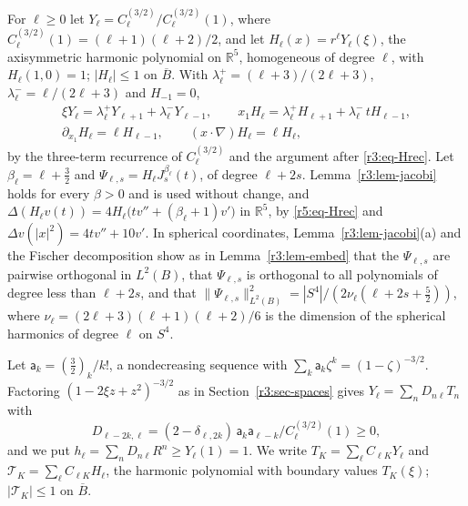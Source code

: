\documentclass[11pt]{amsart}
\theoremstyle{definition}
\theoremstyle{remark}
\numberwithin{equation}{section}
\newcommand{\R}{\mathbb{R}}
\newcommand{\nrm}[1]{\lVert #1\rVert}
\begin{document}
For $\ell\geq0$ let $Y_\ell=C^{(3/2)}_\ell/C^{(3/2)}_\ell(1)$, where $C^{(3/2)}_\ell(1)=(\ell+1)(\ell+2)/2$, and let $H_\ell(x)=r^\ell Y_\ell(\xi)$, the axisymmetric harmonic polynomial on $\R^5$, homogeneous of degree $\ell$, with $H_\ell(1,0)=1$; $|H_\ell|\leq1$ on $\overline B$. With $\lambda^+_\ell=(\ell+3)/(2\ell+3)$, $\lambda^-_\ell=\ell/(2\ell+3)$ and $H_{-1}=0$,
\begin{equation}\label{r5:eq-Hrec}
\begin{gathered}
\xi Y_\ell=\lambda^+_\ell Y_{\ell+1}+\lambda^-_\ell Y_{\ell-1},\qquad x_1H_\ell=\lambda^+_\ell H_{\ell+1}+\lambda^-_\ell\,tH_{\ell-1},\\
\partial_{x_1}H_\ell=\ell H_{\ell-1},\qquad(x\cdot\nabla)H_\ell=\ell H_\ell,
\end{gathered}
\end{equation}
by the three-term recurrence of $C^{(3/2)}_\ell$ and the argument after \eqref{r3:eq-Hrec}. Let $\beta_\ell=\ell+\frac32$ and $\Psi_{\ell,s}=H_\ell J^{\beta_\ell}_s(t)$, of degree $\ell+2s$. Lemma~\ref{r3:lem-jacobi} holds for every $\beta>0$ and is used without change, and $\Delta(H_\ell v(t))=4H_\ell\big(tv''+(\beta_\ell+1)v'\big)$ in $\R^5$, by \eqref{r5:eq-Hrec} and $\Delta v(|x|^2)=4tv''+10v'$. In spherical coordinates, Lemma~\ref{r3:lem-jacobi}(a) and the Fischer decomposition show as in Lemma~\ref{r3:lem-embed} that the $\Psi_{\ell,s}$ are pairwise orthogonal in $L^2(B)$, that $\Psi_{\ell,s}$ is orthogonal to all polynomials of degree less than $\ell+2s$, and that $\nrm{\Psi_{\ell,s}}^2_{L^2(B)}=|S^4|/(2\nu_\ell(\ell+2s+\frac52))$, where $\nu_\ell=(2\ell+3)(\ell+1)(\ell+2)/6$ is the dimension of the spherical harmonics of degree $\ell$ on $S^4$.

Let $\mathsf a_k=(\frac32)_k/k!$, a nondecreasing sequence with $\sum_k\mathsf a_k\zeta^k=(1-\zeta)^{-3/2}$. Factoring $(1-2\xi z+z^2)^{-3/2}$ as in Section~\ref{r3:sec-spaces} gives $Y_\ell=\sum_nD_{n\ell}T_n$ with
\[
D_{\ell-2k,\ell}=(2-\delta_{\ell,2k})\,\mathsf a_k\mathsf a_{\ell-k}/C^{(3/2)}_\ell(1)\geq0,
\]
and we put $h_\ell=\sum_nD_{n\ell}R^n\geq Y_\ell(1)=1$. We write $T_K=\sum_\ell C_{\ell K}Y_\ell$ and $\mathcal T_K=\sum_\ell C_{\ell K}H_\ell$, the harmonic polynomial with boundary values $T_K(\xi)$; $|\mathcal T_K|\leq1$ on $\overline B$.
\end{document}
